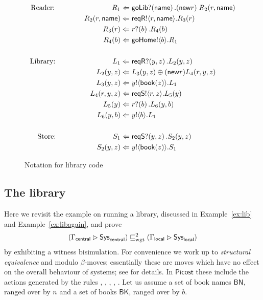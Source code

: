 \documentclass{LMCS}
\newcommand{\pfn}[1]{\mathsf{#1}}  \newcommand{\cfn}[1]{\mathsf{#1}}  \newcommand{\ownfnt}[1]{{\mathsf{#1}}}
\newcommand{\picost}{\ensuremath{\pfn{Picost}}\xspace}
\newcommand{\with}{\mathbin \rhd}
\newcommand{\amort}[1]{\mathrel{\sqsubseteq_{\rm wgt}^{#1}}}
\newcommand{\pa}[1]{\!\left(#1\right)}
\newcommand{\pc}[1]{\langle#1\rangle}
\newcommand{\CnewNT}[1]{(\pfn{new} {#1})}
\begin{document}
\begin{figure}[t]
  
\begin{align*}
\text{Reader:}\qquad\qquad\qquad\qquad  
R_1           &\Leftarrow \goLib?\pa{\Cname}. \CnewNT{r}\;R_2(r,\Cname)\\
  R_2(r,\Cname) &\Leftarrow \reqR!\pc{r,\Cname}. R_3(r)\\
  R_3(r)        &\Leftarrow r?\pa{b}. R_4(b)\\
  R_4(b)        &\Leftarrow \goHome!\pc{b}. R_1\\
\\
\text{Library:}\qquad\qquad\qquad\qquad    L_1   &\Leftarrow \reqR?\pa{y,z}. L_2(y,z) \\
 L_2(y,z) &\Leftarrow L_3(y,z) \oplus \CnewNT{r}   L_4(r,y,z) \\
  L_3(y,z) &\Leftarrow  y!\pc{\Cbook(z)}. L_1\\
L_4(r,y,z) &\Leftarrow \reqS!\pc{r,z}.L_5(y)\\
  L_5(y)   &  \Leftarrow r?\pa{b}. L_6(y,b)\\
  L_6(y,b) &\Leftarrow    y!\pc{b}. L_1 \\
\\
\text{Store:} \qquad\qquad\qquad\qquad 
  S_1 &\Leftarrow \reqS?\pa{y,z}.S_2(y,z) \\
  S_2(y,z) &\Leftarrow y!\pc{\Cbook(z)}. S_1
\end{align*}

  \caption{Notation for library code}
  \label{fig:libcode}

\end{figure}

\subsection{The library}\label{app:library}

\newcommand{\BookN}{\ensuremath{\mathsf{BN}}\xspace}
\newcommand{\Books}{\ensuremath{\mathsf{BK}}\xspace}
\newcommand{\Deltadyn}{\Delta_{\scriptstyle dyn}}

Here we revisit the example on running a library, discussed in Example~\ref{ex:lib} and 
Example~\ref{ex:libagain}, and prove
\begin{align}\label{ex:app.lib}
   ( \Gamma_{\central} \with \Sys_\central)   \amort{2} (\Gamma_{\local} \with \Sys_\local)   
\end{align}
by exhibiting a witness bisimulation.  For convenience we work up to
\emph{structural equivalence} and modulo $\beta$-moves; essentially
these are moves which have no effect on the overall behaviour of
systems; see \cite{dpibook,groote} for details.  In \picost these include the actions  generated by the rules 
, , , , .
Let us assume a set of book names \BookN, ranged over by $n$ and a
set of books \Books, ranged over by $b$. 
\end{document}

